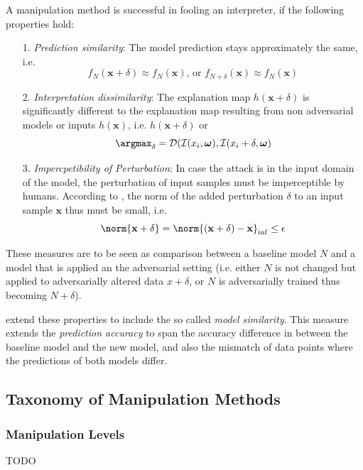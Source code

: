 A manipulation method is successful in fooling an interpreter, if the following properties hold: 
\begin{enumerate}
    \item[1.] \textit{Prediction similarity}: The model prediction stays approximately the same, i.e. $$f_N(\mathbf{x}+\delta) \approx f_N(\mathbf{x}) \text{, or } f_{N+\delta}(\mathbf{x}) \approx f_N(\mathbf{x})$$
    \item[2.] \textit{Interpretation dissimilarity}: The explanation map $h(\mathbf{x}+\delta)$ is significantly different to the explanation map resulting from non adversarial models or inputs $h(\mathbf{x})$, i.e. $h(\mathbf{x}+\delta)$ or $$\argmax_{\delta} = \mathcal{D}(\mathcal{I}(x_i, \boldsymbol{\omega}), \mathcal{I}(x_i+\delta, \boldsymbol{\omega})$$
    \item[3.] \textit{Impercpetibility of Perturbation}: In case the attack is in the input domain of the model, the perturbation of input samples must be imperceptible by humans. According to \cite{dombrowski2019explanations}, the norm of the added perturbation $\delta$ to an input sample $\mathbf{x}$ thus must be small, i.e. $$\norm{\mathbf{x}+\delta} = \norm{(\mathbf{x}+\delta)-\mathbf{x}}_{\inf} \leq \epsilon$$ %
\end{enumerate}
\setlength{\leftskip}{0cm}

These measures are to be seen as comparison between a baseline model $N$ and a model that is applied an the adversarial setting (i.e. either $N$ is not changed but applied to adversarially altered data $x+\delta$, or $N$ is adversarially trained thus becoming $N+\delta$). 

\cite{dimanov2020you} extend these properties to include the so called \textit{model similarity}. This measure extends the \textit{prediction accuracy} to span the accuracy difference in between the baseline model and the new model, and also the mismatch of data points where the predictions of both models differ. 


\subsection{Taxonomy of Manipulation Methods}
\label{subsec:taxonomy_manipulations}

\subsubsection{Manipulation Levels}
\label{subsubsec:manipulation_levels}
TODO 

